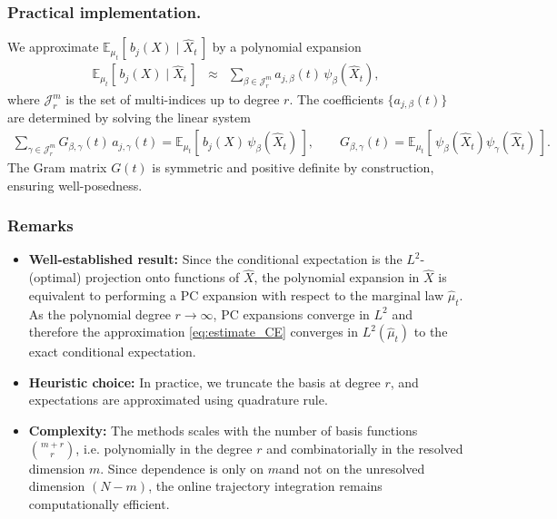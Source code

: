 \documentclass[11pt, a4paper, oneside, reqno]{amsart}
\begin{document}
\subsubsection{Practical implementation.}  
\noindent We approximate $\mathbb{E}_{\mu_t}[\, b_j(X)\mid \hat{X}_t\,]$ by a polynomial expansion
\begin{eqnarray}
\label{eq:estimate_CE}
\mathbb{E}_{\mu_t}[\, b_j(X)\mid \hat{X}_t\,] &\approx& \sum_{\beta\in\mathcal{J}_r^m} a_{j,\beta}(t)\,\psi_\beta(\hat{X}_t),
\end{eqnarray}
where $\mathcal{J}_r^m$ is the set of multi-indices up to degree $r$.  
The coefficients $\{a_{j,\beta}(t)\}$ are determined by solving the linear system
\begin{eqnarray}\label{eq:linear system CE}
\sum_{\gamma\in\mathcal{J}_r^m} G_{\beta,\gamma}(t)\,a_{j,\gamma}(t)
= \mathbb{E}_{\mu_t}\!\left[\, b_j(X)\,\psi_\beta(\hat{X}_t)\,\right],
\qquad 
G_{\beta,\gamma}(t)=\mathbb{E}_{\mu_t}[\,\psi_\beta(\hat{X}_t)\psi_\gamma(\hat{X}_t)\,].
\end{eqnarray}
The Gram matrix $G(t)$ is symmetric and positive definite by construction, ensuring well-posedness.  
\subsubsection{Remarks}  
\begin{itemize}
\item  \textbf{Well-established result:} Since the conditional expectation is the $L^2$-(optimal) projection onto functions of $\hat{X}$, the polynomial expansion in $\hat{X}$ is equivalent to performing a PC expansion with respect to the marginal law $\hat{\mu}_t$. As the polynomial degree $r\to\infty$,
PC expansions converge in $L^2$ and therefore the approximation \eqref{eq:estimate_CE} converges in $L^2(\hat{\mu}_t)$ to the exact conditional expectation. 
\item  \textbf{Heuristic choice:} In practice, we truncate the basis at degree $r$, and expectations are approximated using quadrature rule.  
\item  \textbf{Complexity:} The methods scales with the number of basis functions $\binom{m+r}{r}$, i.e. polynomially in the degree $r$ and combinatorially in the resolved dimension $m$. Since dependence is only on $m$and not on the unresolved dimension $(N-m)$, the online trajectory integration remains computationally efficient. 
\end{itemize}
\end{document}
